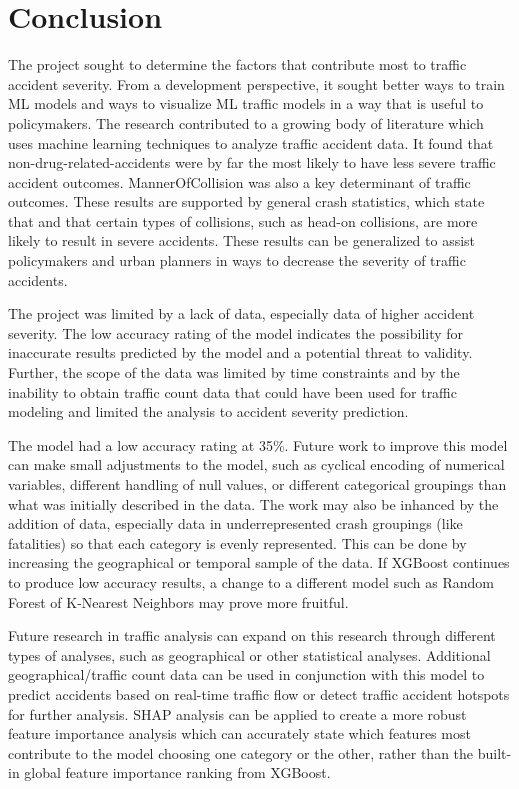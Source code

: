 \documentclass[12pt]{article}
\begin{document}
\section{Conclusion}
The project sought to determine the factors that contribute most to traffic accident severity. From a development perspective,
it sought better ways to train ML models and ways to visualize ML traffic models in a way that is useful to policymakers.
The research contributed to a growing body of literature which uses machine learning techniques to analyze traffic accident
data. It found that non-drug-related-accidents were by far the most likely to have less severe traffic accident
outcomes. MannerOfCollision was also a key determinant of traffic outcomes.
These results are supported by general crash statistics, which state that and that certain types of collisions, such as head-on
collisions, are more likely to result in severe accidents. These results can be generalized to assist policymakers
and urban planners in ways to decrease the severity of traffic accidents. 

The project was limited by a lack of data, especially data of higher accident severity. The low accuracy rating
of the model indicates the possibility for inaccurate results predicted by the model and a potential
threat to validity. Further, the scope of the
data was limited by time constraints and by the inability to obtain traffic count data that could have been
used for traffic modeling and limited the analysis to accident severity prediction. 

The model had a low accuracy rating at 35\%. Future work to improve this model can make small adjustments to the
model, such as cyclical encoding of numerical variables, different handling of null values, or different categorical groupings
than what was initially described in the data. The work may also be inhanced by the addition of data, especially data
in underrepresented crash groupings (like fatalities) so that each category is evenly represented. This can be done by
increasing the geographical or temporal sample of the data. If XGBoost continues to produce low accuracy results, 
a change to a different model such as Random Forest of K-Nearest Neighbors may prove more fruitful.

Future research in traffic analysis can expand on this research through different types of analyses, such as geographical or
other statistical analyses. Additional geographical/traffic count data can be used in conjunction with this model to predict
accidents based on real-time traffic flow or detect traffic accident hotspots for further analysis. 
SHAP analysis can be applied to create a more robust feature importance analysis which can accurately state which
features most contribute to the model choosing one category or the other, rather than the built-in global feature importance
ranking from XGBoost.
\end{document}
